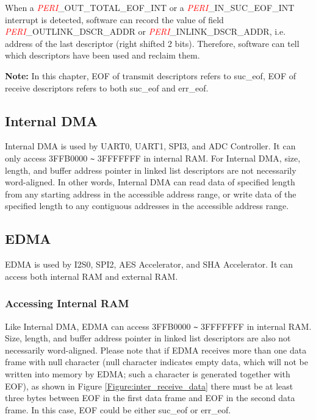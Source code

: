 \documentclass[main\_\_EN.tex]{subfiles}
\begin{document}
When a \textcolor{red}{\it{PERI}}\_OUT\_TOTAL\_EOF\_INT or a \textcolor{red}{\it{PERI}}\_IN\_SUC\_EOF\_INT interrupt is detected, software can record the value of field \textcolor{red}{\it{PERI}}\_OUTLINK\_DSCR\_ADDR or \textcolor{red}{\it{PERI}}\_INLINK\_DSCR\_ADDR, i.e. address of the last descriptor (right shifted 2 bits). Therefore, software can tell which descriptors have been used and reclaim them.

{\bfseries Note: }In this chapter, EOF of transmit descriptors refers to suc\_eof, EOF of receive descriptors refers to both suc\_eof and err\_eof.

\subsection{Internal DMA} \label{internal DMA}

Internal DMA is used by UART0, UART1, SPI3, and ADC Controller. It can only access \hexprefix{}3FFB0000 \verb+~+ \hexprefix{}3FFFFFFF in internal RAM. For Internal DMA, size, length, and buffer address pointer in linked list descriptors are not necessarily word-aligned. In other words, Internal DMA can read data of specified length from any starting address in the accessible address range, or write data of the specified length to any contiguous addresses in the accessible address range.

\subsection{EDMA} \label{edma}

EDMA is used by I2S0, SPI2, AES Accelerator, and SHA Accelerator. It can access both internal RAM and external RAM.

\subsubsection{Accessing Internal RAM}

Like Internal DMA, EDMA can access \hexprefix{}3FFB0000 \verb+~+ \hexprefix{}3FFFFFFF in internal RAM. Size, length, and buffer address pointer in linked list descriptors are also not necessarily word-aligned. Please note that if EDMA receives more than one data frame with null character (null character indicates empty data, which will not be written into memory by EDMA; such a character is generated together with EOF), as shown in Figure \ref{Figure:inter_receive_data} there must be at least three bytes between EOF in the first data frame and EOF in the second data frame. In this case, EOF could be either suc\_eof or err\_eof.
\end{document}
